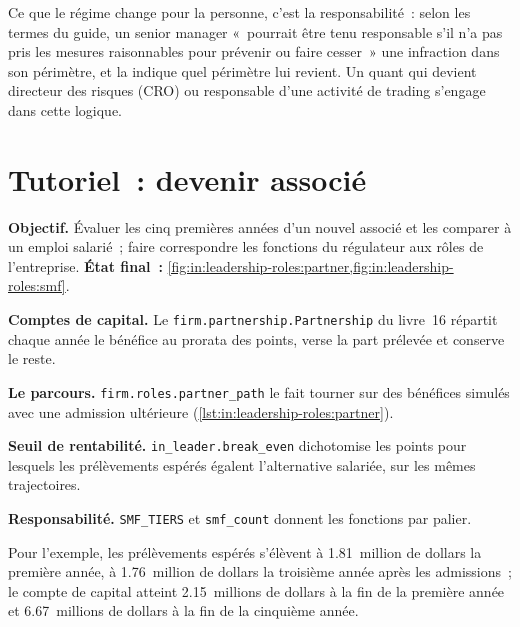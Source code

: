 Ce que le régime change pour la personne, c'est la responsabilité~: selon les termes du guide, un senior manager «~pourrait être tenu
responsable s'il n'a pas pris les mesures raisonnables pour prévenir ou faire cesser~» une infraction dans son périmètre, et la  indique quel périmètre lui revient. Un quant qui devient directeur des risques (CRO) ou responsable d'une activité de trading s'engage dans cette logique.

\section{Tutoriel~: devenir associé}\label{tut:in:leadership-roles:tut}

\begin{tutorial}
\textbf{Objectif.} Évaluer les cinq premières années d'un nouvel associé et les comparer à un emploi salarié~; faire correspondre
les fonctions du régulateur aux rôles de l'entreprise.
\textbf{État final~:} \cref{fig:in:leadership-roles:partner,fig:in:leadership-roles:smf}.
\begin{tutsteps}
\item \textbf{Comptes de capital.} Le \texttt{firm.partnership.Partnership} du livre~16 répartit chaque année le bénéfice au prorata
des points, verse la part prélevée et conserve le reste.
\item \textbf{Le parcours.} \texttt{firm.roles.partner\_path} le fait tourner sur des bénéfices simulés avec une admission ultérieure
(\cref{lst:in:leadership-roles:partner}).
\label{lst:in:leadership-roles:partner}
\item \textbf{Seuil de rentabilité.} \texttt{in\_leader.break\_even} dichotomise les points pour lesquels les prélèvements espérés égalent
l'alternative salariée, sur les mêmes trajectoires.
\item \textbf{Responsabilité.} \texttt{SMF\_TIERS} et \texttt{smf\_count} donnent les fonctions par palier.
\end{tutsteps}
\end{tutorial}

Pour l'exemple, les prélèvements espérés s'élèvent à 1.81~million de dollars la première année, à 1.76~million de dollars la troisième année après les admissions~; le compte de capital
atteint 2.15~millions de dollars à la fin de la première année et 6.67~millions de dollars à la fin de la cinquième année.

